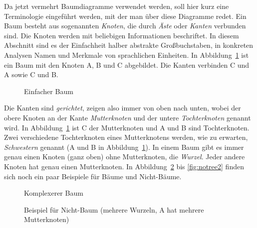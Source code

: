 \label{sec:baumterminologie}


Da jetzt vermehrt Baumdiagramme verwendet werden, soll hier kurz eine Terminologie eingeführt werden, mit der man über diese Diagramme redet.
Ein Baum besteht aus sogenannten \textit{Knoten}, die durch \textit{Äste} oder \textit{Kanten} verbunden sind.
Die Knoten werden mit beliebigen Informationen beschriftet.
In diesem Abschnitt sind es der Einfachheit halber abstrakte Großbuchstaben, in konkreten Analysen Namen und Merkmale von sprachlichen Einheiten.
In Abbildung~\ref{fig:baumschema} ist ein Baum mit den Knoten A, B und C abgebildet.
Die Kanten verbinden C und A sowie C und B.


\begin{figure}
  \centering
  \caption{Einfacher Baum}
  \label{fig:baumschema}
\end{figure}


Die Kanten sind \textit{gerichtet}, zeigen also immer von oben nach unten, wobei der obere Knoten an der Kante \textit{Mutterknoten} und der untere \textit{Tochterknoten} genannt wird.
In Abbildung~\ref{fig:baumschema} ist C der Mutterknoten und A und B sind Tochterknoten.
Zwei verschiedene Tochterknoten eines Mutterknotens werden, wie zu erwarten, \textit{Schwestern} genannt (\zB A und B in Abbildung~\ref{fig:baumschema}).
In einem Baum gibt es immer genau einen Knoten (ganz oben) ohne Mutterknoten, die \textit{Wurzel}.
Jeder andere Knoten hat genau einen Mutterknoten.
In Abbildung~\ref{fig:ctree} bis \ref{fig:notree2} finden sich noch ein paar Beispiele für Bäume und Nicht-Bäume.

\begin{figure}
  \centering
  \caption{Komplexerer Baum}
  \label{fig:ctree}
\end{figure}

\begin{figure}
  \centering
  \caption[Beispiel für Nicht-Baum]{Beispiel für Nicht-Baum (mehrere Wurzeln, A hat mehrere Mutterknoten)}
  \label{fig:notree1}
\end{figure}

